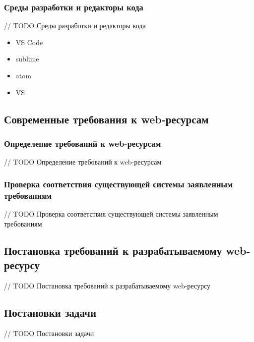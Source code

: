     \subsubsection{Среды разработки и редакторы кода}
    // TODO Среды разработки и редакторы кода
        \begin{itemize}
            \item VS Code
            \item sublime
            \item atom
            \item VS
        \end{itemize}

\subsection{Современные требования к web-ресурсам}
    \subsubsection{Определение требований к web-ресурсам}
    // TODO Определение требований к web-ресурсам
    
    \subsubsection{Проверка соответствия существующей системы заявленным требованиям}
    // TODO Проверка соответствия существующей системы заявленным требованиям

\subsection{Постановка требований к разрабатываемому web-ресурсу}
// TODO Постановка требований к разрабатываемому web-ресурсу

\subsection{Постановки задачи}
// TODO Постановки задачи

\clearpage
